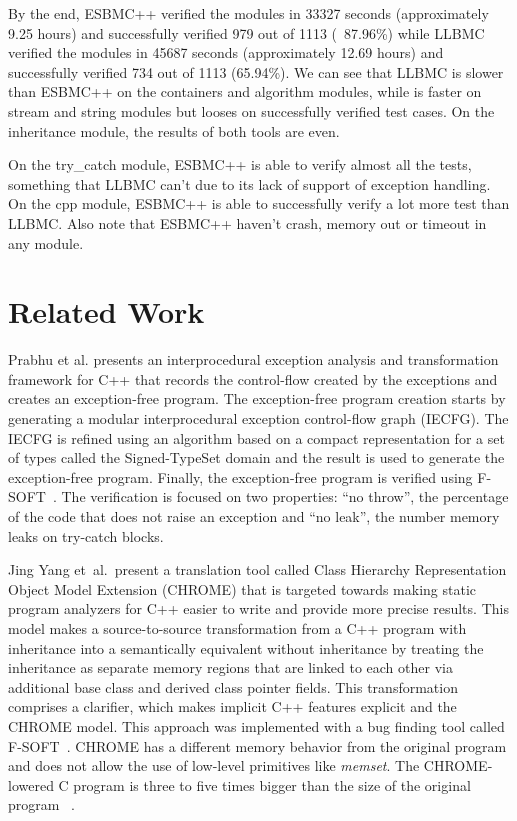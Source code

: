 \documentclass[a4paper]{llncs}
\begin{document}
By the end, ESBMC++ verified the modules in 33327 seconds (approximately 9.25 hours) and successfully verified 979 out of 1113 (~87.96\%) while LLBMC verified the modules in 45687 seconds (approximately 12.69 hours) and successfully verified 734 out of 1113 (65.94\%). We can see that LLBMC is slower than ESBMC++ on the containers and algorithm modules, while is faster on stream and string modules but looses on successfully verified test cases. On the inheritance module, the results of both tools are even.

On the try\_catch module, ESBMC++ is able to verify almost all the tests, something that LLBMC can't due to its lack of support of exception handling. On the cpp module, ESBMC++ is able to successfully verify a lot more test than LLBMC. Also note that ESBMC++ haven't crash, memory out or timeout in any module.


\section{Related Work}

Prabhu et al. presents an interprocedural exception
analysis and transformation framework for C++ that
records the control-flow created by the exceptions
and creates an exception-free program. The exception-free
program creation starts by generating a modular interprocedural
exception control-flow graph (IECFG). The IECFG is refined using
an algorithm based on a compact representation for a set of types
called the Signed-TypeSet domain and the result is used
to generate the exception-free program. Finally, the exception-free
program is verified using F-SOFT~\cite{Fsoft}. The verification is
focused on two properties: ``no throw'', the percentage of the code
that does not raise an exception and ``no leak'', the number memory
leaks on try-catch blocks.~\cite{PrabhuMBIG11}

Jing Yang et~al.\ present a translation tool called Class Hierarchy
Representation Object Model Extension (CHROME) that is targeted towards
making static program analyzers for C++ easier to write and provide
more precise results. This model makes a source-to-source transformation
from a C++ program with inheritance into a semantically equivalent without
inheritance by treating the inheritance as separate memory regions
that are linked to each other via additional base class and derived class
pointer fields. This transformation comprises a clarifier, which makes
implicit C++ features explicit and the CHROME model. This approach was
implemented with a bug finding tool called F-SOFT~\cite{Fsoft}. CHROME has a
different memory behavior from the original program and does not allow the use
of low-level primitives like \textit{memset}. The CHROME-lowered C program is
three to five times bigger than the size of the original program ~\cite{Yang12}.
\end{document}

